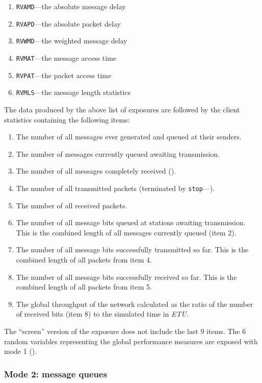 \begin{enumerate}
\item
{\tt RVAMD}---the absolute message delay
\item
{\tt RVAPD}---the absolute packet delay
\item
{\tt RVWMD}---the weighted message delay
\item
{\tt RVMAT}---the message access time
\item
{\tt RVPAT}---the packet access time
\item
{\tt RVMLS}---the message length statistics
\end{enumerate}

The data produced by the above list of exposures are followed by the
client statistics containing the following items:

\begin{enumerate}
\item
The number of all messages ever generated and queued at their senders.
\item
The number of messages currently queued awaiting transmission.
\item
The number of all messages completely received ().
\item
The number of all transmitted packets (terminated by
{\tt stop}---).
\item
The number of all received packets.
\item
The number of all message bits queued at stations awaiting transmission.
This is the combined length of all messages currently queued (item 2).
\item
The number of all message bits successfully transmitted so far.
This is the combined length of all packets from item 4.
\item
The number of all message bits successfully received so far.
This is the combined length of all packets from item 5.
\item
The global throughput of the network calculated as the ratio of the
number of received bits (item 8) to the simulated time in {\em ETU}.
\end{enumerate}

The ``screen'' version of the exposure does not include the last 9 items.
The 6 random variables representing the global performance measures are
exposed with mode 1 ().

\subsubsection*{Mode 2: message queues}

